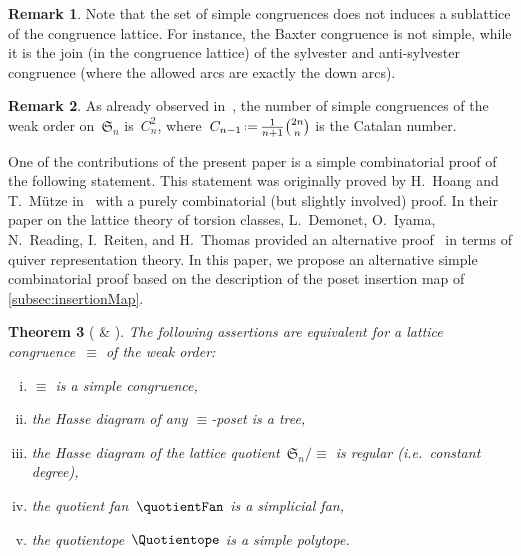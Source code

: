 \documentclass{amsart}
\newtheorem{theorem}{Theorem}[section]
\theoremstyle{definition}
\newtheorem{remark}[theorem]{Remark}
\newcommand{\f}[1]{{\mathfrak{#1}}} %
\newcommand{\eqdef}{\mbox{\,\raisebox{0.2ex}{\scriptsize\ensuremath{\mathrm:}}\ensuremath{=}\,}} %
\newcommand{\ie}{\textit{i.e.}~} %
\begin{document}
\begin{remark}
Note that the set of simple congruences does not induces a sublattice of the congruence lattice.
For instance, the Baxter congruence is not simple, while it is the join (in the congruence lattice) of the sylvester and anti-sylvester congruence (where the allowed arcs are exactly the down arcs).
\end{remark}

\begin{remark}
As already observed in~\cite[Sect.~4.4]{HoangMutze}, the number of simple congruences of the weak order on~$\f{S}_n$ is~$C_n^2$, where~$C_{n-1} \eqdef \frac{1}{n+1} \binom{2n}{n}$ is the Catalan number.
\end{remark}

One of the contributions of the present paper is a simple combinatorial proof of the following statement.
This statement was originally proved by H.~Hoang and T.~Mütze in~\cite[Sect.~4.4]{HoangMutze} with a purely combinatorial (but slightly involved) proof.
In their paper on the lattice theory of torsion classes, L.~Demonet, O.~Iyama, N.~Reading, I.~Reiten, and H.~Thomas provided an alternative proof~\cite[Sect.~6.3]{DemonetIyamaReadingReitenThomas} in terms of quiver representation theory.
In this paper, we propose an alternative simple combinatorial proof based on the description of the poset insertion map of \cref{subsec:insertionMap}.

\begin{theorem}[{\cite[Sect.~4.4]{HoangMutze} \& \cite[Sect.~6.3]{DemonetIyamaReadingReitenThomas}}]
\label{thm:simpleCongruences}
The following assertions are equivalent for a lattice congruence~$\equiv$ of the weak order:
\begin{enumerate}[(i)]
\item $\equiv$ is a simple congruence,
\item the Hasse diagram of any $\equiv$-poset is a tree,
\item the Hasse diagram of the lattice quotient~$\f{S}_n/{\equiv}$ is regular (\ie constant degree),
\item the quotient fan~$\quotientFan$ is a simplicial fan,
\item the quotientope~$\Quotientope$ is a simple polytope.
\end{enumerate}
\end{theorem}
\end{document}
